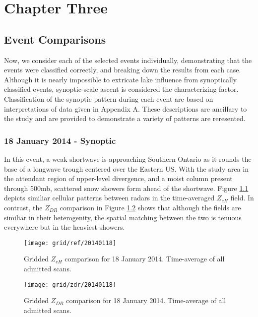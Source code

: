 \chapter{Chapter Three}

\section{Event Comparisons}
Now, we consider each of the selected events individually, demonstrating that the events were
classified correctly, and breaking down the results from each case. Although it is nearly impossible to
extricate lake influence from synoptically classified events, synoptic-scale ascent is considered the
characterizing factor. Classification of the synoptic pattern during each event are based on interpretations of data given in Appendix A. 
These descriptions are ancillary to the study and are provided to demonstrate a variety of patterns are reresented.

\subsection{18 January 2014 - Synoptic}
In this event, a weak shortwave is approaching Southern Ontario as it rounds the base of a longwave
trough centered over the Eastern US. With the study area in the attendant
region of upper-level divergence, and a moist column present through 500mb, 
scattered snow showers form ahead of the shortwave. Figure \ref{fig:grid_ref_20140118} depicts
similiar cellular patterns between radars in the time-averaged $Z_{eH}$ field. In contrast, the $Z_{DR}$
comparison in Figure \ref{fig:grid_zdr_20140118}
shows that although the fields are similiar in their heterogenity, the spatial matching between the two is
tenuous everywhere but in the heaviest showers.

\begin{figure}[H]
\texttt{[image: grid/ref/20140118]}
\caption{Gridded $Z_{eH}$ comparison for 18 January 2014. Time-average of all admitted scans.} 
\label{fig:grid_ref_20140118}
\end{figure}

\begin{figure}[H]
\texttt{[image: grid/zdr/20140118]}
\caption{Gridded $Z_{DR}$ comparison for 18 January 2014. Time-average of all admitted scans.} 
\label{fig:grid_zdr_20140118}
\end{figure}
\vspace{5mm}

